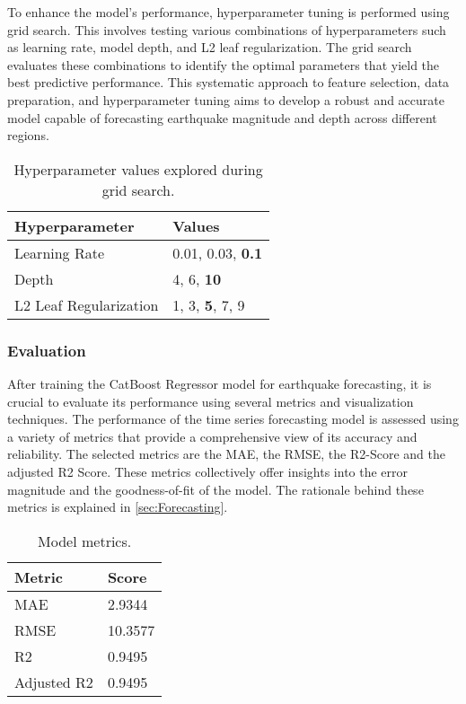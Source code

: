 To enhance the model's performance, hyperparameter tuning is performed using grid search. This involves testing various combinations of hyperparameters such as learning rate, model depth, and L2 leaf regularization. The grid search evaluates these combinations to identify the optimal parameters that yield the best predictive performance. This systematic approach to feature selection, data preparation, and hyperparameter tuning aims to develop a robust and accurate model capable of forecasting earthquake magnitude and depth across different regions.

\begin{table}[h!]
\centering
\begin{tabular}{ll}
\toprule
\textbf{Hyperparameter} & \textbf{Values} \\ \midrule
Learning Rate           & 0.01, 0.03, \textbf{0.1} \\ \midrule
Depth                   & 4, 6, \textbf{10}        \\ \midrule
L2 Leaf Regularization  & 1, 3, \textbf{5}, 7, 9   \\ \bottomrule
\end{tabular}
\caption{Hyperparameter values explored during grid search.}
\label{table:hyperparameters}
\end{table}

\subsubsection{Evaluation}
After training the CatBoost Regressor model for earthquake forecasting, it is crucial to evaluate its performance using several metrics and visualization techniques. The performance of the time series forecasting model is assessed using a variety of metrics that provide a comprehensive view of its accuracy and reliability. The selected metrics are the \ac{MAE}, the \ac{RMSE}, the R2-Score and the adjusted R2 Score. These metrics collectively offer insights into the error magnitude and the goodness-of-fit of the model. The rationale behind these metrics is explained in \ref{sec:Forecasting}. 

\begin{table}[H]
\centering
\begin{tabular}{ll}
\toprule
\textbf{Metric} & \textbf{Score} \\ \midrule
MAE           & 2.9344 \\ \midrule
RMSE                   & 10.3577        \\ \midrule
R2  & 0.9495   \\ \midrule
Adjusted R2  & 0.9495   \\ \bottomrule
\end{tabular}
\caption{Model metrics.}
\label{table:model-metrics}
\end{table}

